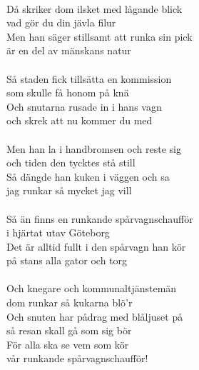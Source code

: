 \\
Då skriker dom ilsket med lågande blick\\
vad gör du din jävla filur\\
Men han säger stillsamt att runka sin pick\\
är en del av mänskans natur\\
\\
Så staden fick tillsätta en kommission\\
som skulle få honom på knä\\
Och snutarna rusade in i hans vagn\\
och skrek att nu kommer du med\\
\\
Men han la i handbromsen och reste sig\\
och tiden den tycktes stå still\\
Så dängde han kuken i väggen och sa\\
jag runkar så mycket jag vill\\
\\
Så än finns en runkande spårvagnschaufför\\
i hjärtat utav Göteborg\\
Det är alltid fullt i den spårvagn han kör\\
på stans alla gator och torg\\
\\
Och knegare och kommunaltjänstemän\\
dom runkar så kukarna blö’r \\
Och snuten har pådrag med blåljuset på\\
så resan skall gå som sig bör\\
För alla ska se vem som kör\\
vår runkande spårvagnschaufför!
